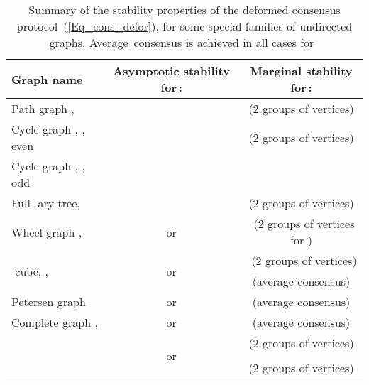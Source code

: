 \documentclass[letterpaper,9pt,twocolumn]{autart}
\begin{document}
\begin{table*}[t!]
\renewcommand{\arraystretch}{1.42}
\begin{center}
  \begin{tabular}{|l|c|c|} \hline
    \textbf{Graph name} & \textbf{Asymptotic stability for\,:}
    & \textbf{Marginal stability for\,:}\\
    \hline\hline
    Path graph ,  &  & \; (2 groups of vertices)\vspace{0.01cm}\\
    \hline
    Cycle graph , ,  even &  &\hspace{0.01cm} \; (2 groups of vertices)\vspace{0.01cm}\\
    \hline
    Cycle graph , ,  odd &  & \vspace{0.01cm}\\
    \hline
    Full -ary tree,  &  & \; (2 groups of vertices)\vspace{0.01cm}\\
    \hline
    Wheel graph ,  &   \,or\,  & \, (2 groups of vertices for )\vspace{0.01cm}\\
    \hline
    \multirow{2}{*}{-cube, , } &  \multirow{2}{*}{ or }
    & \, (2 groups of vertices)\vspace{0.01cm}\\
    & & \; (average consensus)\vspace{0.01cm}\\
    \hline
    Petersen graph &  \,or\,  & \; (average consensus) \vspace{0.01cm}\\
    \hline
    Complete graph ,  &  \,or\,  & \; (average consensus) \vspace{0.01cm}\\
    \hline
    \multirow{3}{*}{
     
    }   
& \multirow{4}{*}{ or } &
    \;
    (2 groups of vertices)\\
    & & \!
    
    \vspace{0.01cm}\\\hline
    Star graph ,  &  & \; (2 groups of vertices)\\
    \hline
  \end{tabular}
  \vspace{0.3cm}
  \caption{Summary of the stability properties of the deformed consensus protocol~(\ref{Eq_cons_defor}),
  for some special families of undirected graphs. Average~consensus is achieved in all cases for~}\label{Table1}
\end{center}
\end{table*}
\end{document}

